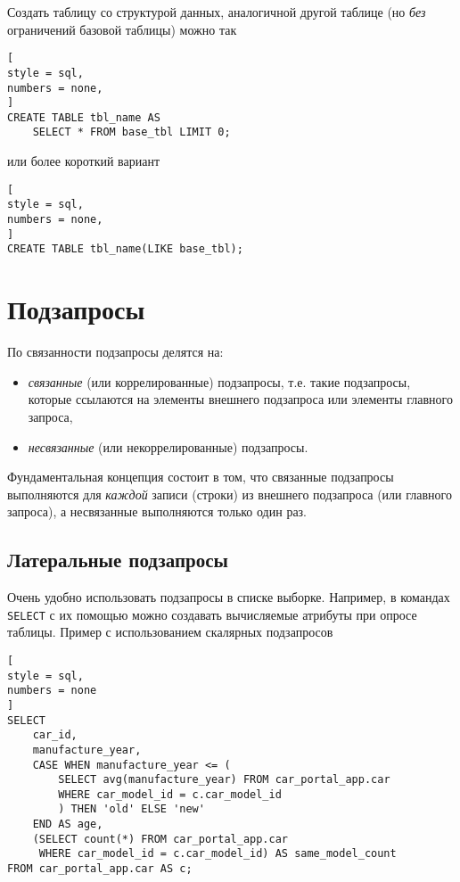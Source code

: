 \documentclass[%
	11pt,
	a4paper,
	utf8,
		]{article}
\begin{document}
Создать таблицу со структурой данных, аналогичной другой таблице (но \emph{без} ограничений базовой таблицы) можно так
\begin{lstlisting}[
style = sql,
numbers = none,
]
CREATE TABLE tbl_name AS
    SELECT * FROM base_tbl LIMIT 0;
\end{lstlisting}  
или более короткий вариант
\begin{lstlisting}[
style = sql,
numbers = none,
]
CREATE TABLE tbl_name(LIKE base_tbl);
\end{lstlisting}

\section{Подзапросы}

По связанности подзапросы делятся на:
\begin{itemize}
	\item \emph{связанные} (или коррелированные) подзапросы, т.е. такие подзапросы, которые ссылаются на элементы внешнего подзапроса или элементы главного запроса,
	
	\item \emph{несвязанные} (или некоррелированные) подзапросы.
\end{itemize}

Фундаментальная концепция состоит в том, что связанные подзапросы выполняются для \emph{каждой} записи (строки) из внешнего подзапроса (или главного запроса), а несвязанные выполняются только один раз.

\subsection{Латеральные подзапросы}

Очень удобно использовать подзапросы в списке выборке. Например, в командах \texttt{SELECT} с их помощью можно создавать вычисляемые атрибуты при опросе таблицы. Пример с использованием скалярных подзапросов
\begin{lstlisting}[
style = sql,
numbers = none
]
SELECT
    car_id,
    manufacture_year,
    CASE WHEN manufacture_year <= (
        SELECT avg(manufacture_year) FROM car_portal_app.car
        WHERE car_model_id = c.car_model_id
        ) THEN 'old' ELSE 'new'
    END AS age,
    (SELECT count(*) FROM car_portal_app.car
     WHERE car_model_id = c.car_model_id) AS same_model_count
FROM car_portal_app.car AS c;
\end{lstlisting}
\end{document}
